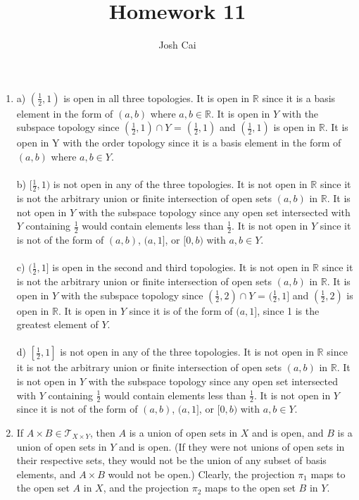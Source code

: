 \documentclass{article}
\begin{document}
\title{Homework 11}
\author{Josh Cai}

\maketitle


\begin{enumerate}
\item
a) $(\frac{1}{2},1)$ is open in all three topologies. It is open in $\mathbb{R}$ since it is a basis element in the form of $(a,b)$ where $a,b\in \mathbb{R}$. It is open in $Y$ with the subspace topology since $(\frac{1}{2},1) \cap Y$ = $(\frac{1}{2},1)$ and $(\frac{1}{2},1)$ is open in $\mathbb{R}$. It is open in Y with the order topology since it is a basis element in the form of $(a,b)$ where $a,b \in Y$.
\\\\b) $[\frac{1}{2},1)$ is not open in any of the three topologies. It is not open in $\mathbb{R}$ since it is not the arbitrary union or finite intersection of open sets $(a,b)$ in $\mathbb{R}$. It is not open in $Y$ with the subspace topology since any open set intersected with $Y$ containing $\frac{1}{2}$ would contain elements less than $\frac{1}{2}$. It is not open in $Y$ since it is not of the form of $(a,b)$, $(a,1]$, or $[0,b)$ with $a,b \in Y$. 
\\\\c) $(\frac{1}{2},1]$ is open in the second and third topologies. It is not open in $\mathbb{R}$ since it is not the arbitrary union or finite intersection of open sets $(a,b)$ in $\mathbb{R}$. It is open in $Y$ with the subspace topology since $(\frac{1}{2},2) \cap Y$ = $(\frac{1}{2},1]$ and $(\frac{1}{2},2)$ is open in $\mathbb{R}$. It is open in $Y$ since it is of the form of $(a,1]$, since 1 is the greatest element of $Y$. 
\\\\d) $[\frac{1}{2},1]$ is not open in any of the three topologies. It is not open in $\mathbb{R}$ since it is not the arbitrary union or finite intersection of open sets $(a,b)$ in $\mathbb{R}$. It is not open in $Y$ with the subspace topology since any open set intersected with $Y$ containing $\frac{1}{2}$ would contain elements less than $\frac{1}{2}$. It is not open in $Y$ since it is not of the form of $(a,b)$, $(a,1]$, or $[0,b)$ with $a,b \in Y$. 

\item
If $A \times B \in \mathcal{T}_{X \times Y}$, then $A$ is a union of open sets in $X$ and is open, and $B$ is a union of open sets in $Y$ and is open. (If they were not unions of open sets in their respective sets, they would not be the union of any subset of basis elements, and $A \times B$ would not be open.) Clearly, the projection $\pi_1$ maps to the open set $A$ in $X$, and the projection $\pi_2$ maps to the open set $B$ in $Y$.


\end{enumerate}
\end{document}

